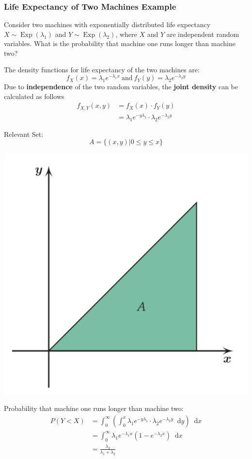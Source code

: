 \documentclass[11pt]{article}
\theoremstyle{definition}
\newcommand*\diff{\mathop{}\!\mathrm{d}}
\newcommand*\Exp[1]{\mathop{\text{Exp}}\left(#1\right)}
\begin{document}
\subsubsection{Life Expectancy of Two Machines Example}
Consider two machines with exponentially distributed life expectancy $X\sim \Exp{\lambda_1}$ and $Y\sim\Exp{\lambda_2}$, where $X$ and $Y$ are independent random variables. What is the probability that machine one runs longer than machine two?

The density functions for life expectancy of the two machines are:
\begin{equation*}
	f_X(x) = \lambda_1 e^{-\lambda_1 x}\ \text{and}\ f_Y(y) = \lambda_2 e^{-\lambda_2 y}
\end{equation*}
Due to \textbf{independence} of the two random variables, the \textbf{joint density} can be calculated as follows
\begin{align}
	f_{X,Y} (x,y) &= f_X(x) \cdot f_Y(y)\\
	&= \lambda_1 e^{-y\lambda_1} \cdot \lambda_2 e^{-\lambda_2 y}
\end{align}
\begin{minipage}{0.6\linewidth}
	Relevant Set:
	\begin{equation*}
		A = \{(x,y)|0\leq y\leq x\}
	\end{equation*}
\end{minipage}
\begin{minipage}{0.4\linewidth}
	\begin{center}
		\includegraphics[width=0.6\linewidth]{img/area_A_under_xy}
	\end{center}	
\end{minipage}
Probability that machine one runs longer than machine two:
\begin{align*}
	P(Y<X) &= \int_{0}^{\infty}(\int_{0}^{x} \lambda_1 e^{-y\lambda_1} \cdot \lambda_2 e^{-\lambda_2 y} \diff y )\diff x\\
	&= \int_{0}^{\infty} \lambda_1e^{-\lambda_1 x} (1 - e^{-\lambda_2 x})\diff x\\
	&= \frac{\lambda_2}{\lambda_1 + \lambda_2}
\end{align*}
\end{document}

